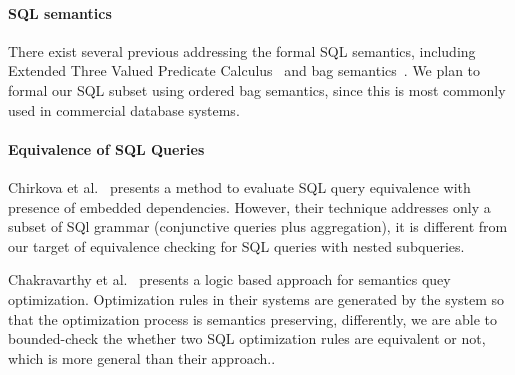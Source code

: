 \documentclass{article}
\begin{document}
\paragraph{SQL semantics} There exist several previous addressing the formal SQL semantics, including Extended Three Valued Predicate Calculus~\cite{Negri:1991:FSS:111197.111212} and bag semantics~\cite{chinaei2007ordered}. We plan to formal our SQL subset using ordered bag semantics, since this is most commonly used in commercial database systems.

\paragraph{Equivalence of SQL Queries} Chirkova et al.~\cite{chirkova2009equivalence} presents a method to evaluate SQL query equivalence with presence of embedded dependencies. However, their technique addresses only a subset of SQl grammar (conjunctive queries plus aggregation), it is different from our target of equivalence checking for SQL queries with nested subqueries. 

Chakravarthy et al.~\cite{Chakravarthy:1990:LAS:78922.78924} presents a logic based approach for semantics quey optimization. Optimization rules in their systems are generated by the system so that the optimization process is semantics preserving, differently, we are able to bounded-check the whether two SQL optimization rules are equivalent or not, which is more general than their approach..

{}

\end{document}
